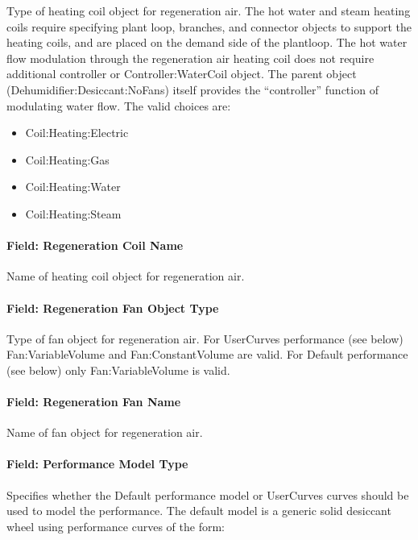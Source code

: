 Type of heating coil object for regeneration air. The hot water and steam heating coils require specifying plant loop, branches, and connector objects to support the heating coils, and are placed on the demand side of the plantloop. The hot water flow modulation through the regeneration air heating coil does not require additional controller or Controller:WaterCoil object. The parent object (Dehumidifier:Desiccant:NoFans) itself provides the ``controller'' function of modulating water flow. The valid choices are:

\begin{itemize}
\item
  Coil:Heating:Electric
\item
  Coil:Heating:Gas
\item
  Coil:Heating:Water
\item
  Coil:Heating:Steam
\end{itemize}

\paragraph{Field: Regeneration Coil Name}\label{field-regeneration-coil-name}

Name of heating coil object for regeneration air.

\paragraph{Field: Regeneration Fan Object Type}\label{field-regeneration-fan-object-type}

Type of fan object for regeneration air. For UserCurves performance (see below) Fan:VariableVolume and Fan:ConstantVolume are valid. For Default performance (see below) only Fan:VariableVolume is valid.

\paragraph{Field: Regeneration Fan Name}\label{field-regeneration-fan-name}

Name of fan object for regeneration air.

\paragraph{Field: Performance Model Type}\label{field-performance-model-type}

Specifies whether the Default performance model or UserCurves curves should be used to model the performance. The default model is a generic solid desiccant wheel using performance curves of the form:

